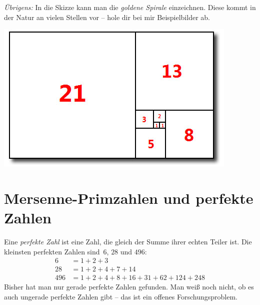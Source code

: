 \documentclass{../../zirkelblatt}
\begin{document}
\emph{Übrigens:} In die Skizze kann man die \emph{goldene Spirale} einzeichnen.
Diese kommt in der Natur an vielen Stellen vor -- hole dir bei mir Beispielbilder ab.
\begin{center}
\includegraphics[scale=0.7]{fibonacci-quadrate}
\end{center}


\newpage
\section*{Mersenne-Primzahlen und perfekte Zahlen}
Eine \emph{perfekte Zahl} ist eine Zahl, die gleich der Summe ihrer echten
Teiler ist. Die kleinsten perfekten Zahlen sind~$6$, $28$ und $496$:
\begin{align*}
  6 &= 1 + 2 + 3 \\
  28 &= 1 + 2 + 4 + 7 + 14 \\
  496 &= 1 + 2 + 4 + 8 + 16 + 31 + 62 + 124 + 248
\end{align*}
Bisher hat man nur gerade perfekte Zahlen gefunden. Man weiß noch nicht, ob es
auch ungerade perfekte Zahlen gibt -- das ist ein offenes Forschungsproblem.
\end{document}
